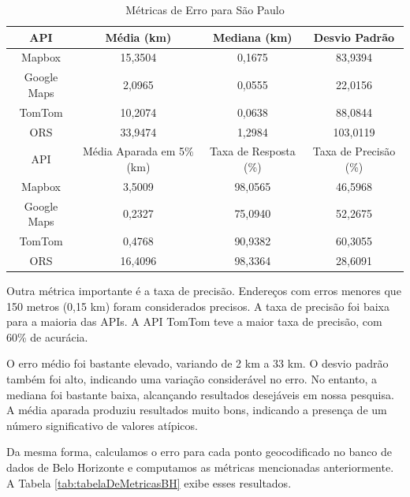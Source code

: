 \begin{table}[!ht]
    \centering
    \caption{Métricas de Erro para São Paulo}
    \label{tab:tabelaDeMetricasSP}
    \begin{adjustbox}{width=0.7\textwidth}
    \begin{tabular}{|c|c|c|c|}
    \hline
    API & Média (km) & Mediana (km) & Desvio Padrão \\
    \hline
    Mapbox & 15,3504 & 0,1675 & 83,9394 \\
    Google Maps & 2,0965 & 0,0555 & 22,0156 \\
    TomTom & 10,2074 & 0,0638 & 88,0844 \\
    ORS & 33,9474 & 1,2984 & 103,0119 \\
    \hline
    \hline
    API & Média Aparada em 5\% (km) & Taxa de Resposta (\%) & Taxa de Precisão (\%) \\
    \hline
    Mapbox & 3,5009 & 98,0565 & 46,5968 \\
    Google Maps & 0,2327 & 75,0940 & 52,2675 \\
    TomTom & 0,4768 & 90,9382 & 60,3055 \\
    ORS & 16,4096 & 98,3364 & 28,6091 \\
    \hline
    \end{tabular}
    \end{adjustbox}
\end{table}

Outra métrica importante é a taxa de precisão. Endereços com erros menores que 150 metros (0,15 km) foram considerados precisos. A taxa de precisão foi baixa para a maioria das APIs. A API TomTom teve a maior taxa de precisão, com 60\% de acurácia.

O erro médio foi bastante elevado, variando de 2 km a 33 km. O desvio padrão também foi alto, indicando uma variação considerável no erro. No entanto, a mediana foi bastante baixa, alcançando resultados desejáveis em nossa pesquisa. A média aparada produziu resultados muito bons, indicando a presença de um número significativo de valores atípicos.

Da mesma forma, calculamos o erro para cada ponto geocodificado no banco de dados de Belo Horizonte e computamos as métricas mencionadas anteriormente. A Tabela \ref{tab:tabelaDeMetricasBH} exibe esses resultados.

